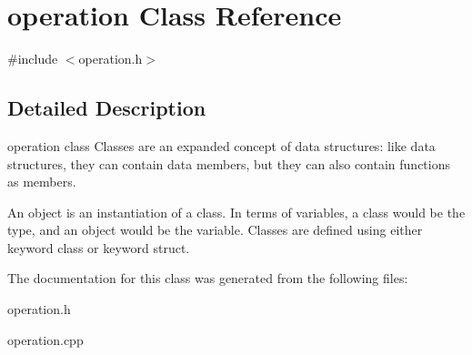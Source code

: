 \hypertarget{classoperation}{}\section{operation Class Reference}
\label{classoperation}


{\ttfamily \#include $<$operation.\+h$>$}



\subsection{Detailed Description}
operation class Classes are an expanded concept of data structures\+: like data structures, they can contain data members, but they can also contain functions as members.

An object is an instantiation of a class. In terms of variables, a class would be the type, and an object would be the variable. Classes are defined using either keyword class or keyword struct. 

The documentation for this class was generated from the following files\+:\begin{DoxyCompactItemize}
\item 
operation.\+h\item 
operation.\+cpp\end{DoxyCompactItemize}
